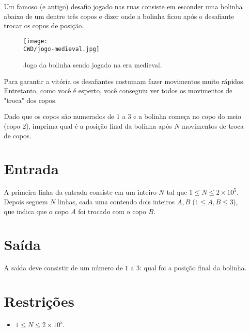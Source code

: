 %

Um famoso (e antigo) desafio jogado nas ruas consiste em esconder uma bolinha abaixo de um dentre três copos e dizer onde a bolinha ficou após o desafiante trocar os copos de posição.

\begin{figure}[H]
  \centering
  \texttt{[image: \\CWD/jogo-medieval.jpg]}
  \caption{Jogo da bolinha sendo jogado na era medieval.}
\end{figure}

Para garantir a vitória os desafiantes costumam fazer movimentos muito rápidos. Entretanto, como você é esperto, você conseguiu ver todos os movimentos de "troca" dos copos. 

Dado que os copos são numerados de $1$ a $3$ e a bolinha começa no copo do meio (copo $2$), imprima qual é a posição final da bolinha após $N$ movimentos de troca de copos.

%
%

\section*{Entrada}

A primeira linha da entrada consiste em um inteiro $N$ tal que $1 \leq N \leq 2\times10^5$. Depois seguem $N$ linhas, cada uma contendo dois inteiros $A, B$ ($1 \leq A, B \leq 3$), que indica que o copo $A$ foi trocado com o copo $B$.

%
%

\section*{Saída}

A saída deve consistir de um número de $1$ a $3$: qual foi a posição final da bolinha.

\section*{Restrições}

\begin{itemize}
\item $1 \leq N \leq 2\times 10^5$.
\end{itemize}


\exemplo
